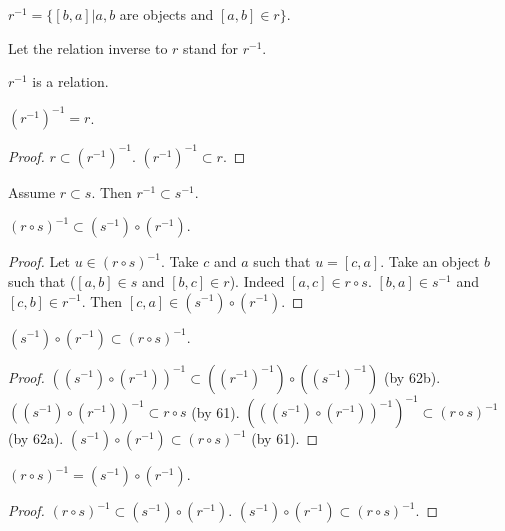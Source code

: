\documentclass[a4paper,draft]{amsproc}
\begin{document}
\begin{forthel}
\begin{definition}
$r^{-1} = \{[b,a] | a, b$ are objects and $[a,b] \in r\}$.
\end{definition}
Let the relation inverse to $r$ stand for $r^{-1}$.

\begin{lemma*}
$r^{-1}$ is a relation.
\end{lemma*}

\begin{theorem}
$(r^{-1})^{-1} = r$.
\end{theorem}
\begin{proof}
$r \subset (r^{-1})^{-1}$.
$(r^{-1})^{-1} \subset r$.
\end{proof}

\begin{lemma}
Assume $r \subset s$. Then $r^{-1} \subset s^{-1}$.
\end{lemma}


\begin{lemma}
$(r \circ s)^{-1} \subset (s^{-1}) \circ (r^{-1})$.
\end{lemma}
\begin{proof}
Let $u \in (r \circ s)^{-1}$.
Take $c$ and $a$ such that $u = [c,a]$.
Take an object $b$ such that ($[a,b] \in s$ and $[b,c] \in r$).
Indeed $[a,c] \in r \circ s$.
$[b,a] \in s^{-1}$ and $[c,b] \in r^{-1}$.
Then $[c,a] \in (s^{-1}) \circ (r^{-1})$.
\end{proof}

\begin{lemma}
$(s^{-1}) \circ (r^{-1}) \subset (r \circ s)^{-1}$.
\end{lemma}
\begin{proof}
$((s^{-1}) \circ (r^{-1}))^{-1} \subset ((r^{-1})^{-1}) \circ ((s^{-1})^{-1})$ (by 62b).
$((s^{-1}) \circ (r^{-1}))^{-1} \subset r \circ s$ (by 61).
$(((s^{-1}) \circ (r^{-1}))^{-1})^{-1} \subset (r \circ s)^{-1}$ (by 62a).
$(s^{-1}) \circ (r^{-1}) \subset (r \circ s)^{-1}$ (by 61).
\end{proof}

\begin{theorem}
$(r \circ s)^{-1} = (s^{-1}) \circ (r^{-1})$.
\end{theorem}
\begin{proof}
$(r \circ s)^{-1} \subset (s^{-1}) \circ (r^{-1})$.
$(s^{-1}) \circ (r^{-1}) \subset (r \circ s)^{-1}$.
\end{proof}


\end{forthel}
\end{document}
